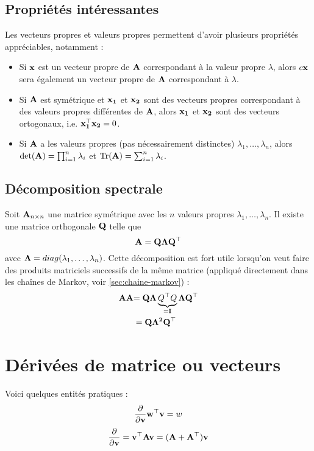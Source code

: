 \documentclass[12pt, french]{report}
\begin{document}
\subsection{Propriétés intéressantes}
Les vecteurs propres et valeurs propres permettent d'avoir plusieurs propriétés appréciables, notamment : 
\begin{itemize}
\item Si $\mathbf{x}$ est un vecteur propre de $\mathbf{A}$ correspondant à la valeur propre $\lambda$, alors $c\mathbf{x}$ sera également un vecteur propre de $\mathbf{A}$ correspondant à $\lambda$.
\item Si $\mathbf{A}$ est symétrique et $\mathbf{x_1}$ et $\mathbf{x_2}$ sont des vecteurs propres correspondant à des valeurs propres différentes de $\mathbf{A}$, alors $\mathbf{x_1}$ et $\mathbf{x_2}$ sont des vecteurs ortogonaux, i.e. $\mathbf{x_{1}^{\top} x_2}  =0$.
\item Si $\mathbf{A}$ a les valeurs propres (pas nécessairement distinctes) $\lambda_1, \dots, \lambda_n$, alors $\det(\mathbf{A}) = \prod_{i=1}^{n} \lambda_i$ et $\operatorname{Tr}(\mathbf{A}) = \sum_{i=1}^{n} \lambda_i$.
\end{itemize}

\subsection{Décomposition spectrale} Soit $\mathbf{A}_{n\times n}$ une matrice symétrique avec les $n$ valeurs propres $\lambda_1, \dots, \lambda_n$. Il existe une matrice orthogonale $\mathbf{Q}$ telle que
\begin{equation}
\label{eq:decomposition-spectrale}
\mathbf{A = Q \Lambda Q^{\top}}
\end{equation}
avec $\mathbf{\Lambda} = diag(\lambda_1, \dots , \lambda_n)$. Cette décomposition est fort utile lorsqu'on veut faire des produits matriciels successifs de la même matrice (appliqué directement dans les chaînes de Markov, voir \autoref{sec:chaine-markov}) : 
\begin{align*}
\mathbf{AA} & \mathbf{= Q \Lambda \underbrace{Q^{\top} Q}_{=I} \Lambda Q^{\top} } \\
 & = \mathbf{Q \Lambda^2 Q^{\top}}
\end{align*}

\section{Dérivées de matrice ou vecteurs}
Voici quelques entités pratiques : 
\begin{align*}
\frac{\partial}{\partial \mathbf{v}} \mathbf{w^{\top} v} = w
\end{align*}
\begin{align*}
\frac{\partial}{\partial \mathbf{v}} = \mathbf{v^{\top} A v = (A + A^{\top})v}
\end{align*}
\end{document}
